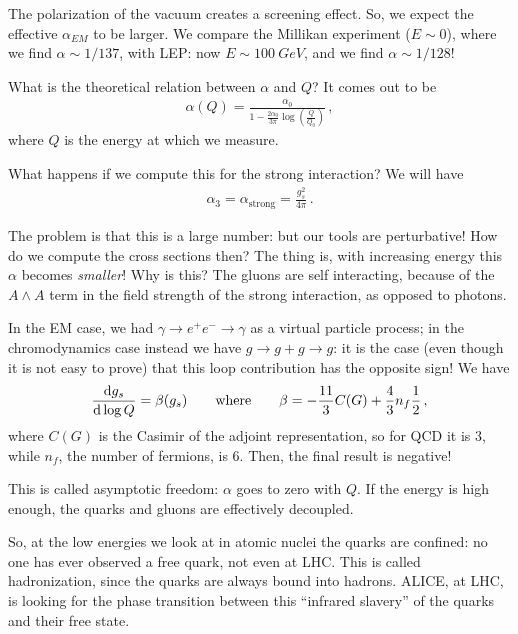 \documentclass[main.tex]{subfiles}
\begin{document}
The polarization of the vacuum creates a screening effect. 
So, we expect the effective \(\alpha_{EM}\) to be larger. 
We compare the Millikan experiment (\(E \sim 0\)), where we find \(\alpha \sim 1/137\), with LEP: now \(E \sim \SI{100}{GeV}\), and we find \(\alpha \sim 1/128\)!

What is the theoretical relation between \(\alpha \) and \(Q\)? It comes out to be 
%
\begin{align}
\alpha (Q) = \frac{\alpha_0 }{1 - \frac{2 \alpha_0 }{3 \pi } \log(\frac{Q}{Q_0 })}
\,,
\end{align}
%
where \(Q\) is the energy at which we measure. 

What happens if we compute this for the strong interaction? We will have 
%
\begin{align}
\alpha_3 = \alpha _{\text{strong}} = \frac{g^2_{s}}{4 \pi }
\,.
\end{align}

The problem is that this is a large number: but our tools are perturbative! How do we compute the cross sections then? 
The thing is, with increasing energy this \(\alpha \) becomes \emph{smaller}! 
Why is this? The gluons are self interacting, because of the \(A \wedge A\) term in the field strength of the strong interaction, as opposed to photons. 

In the EM case, we had \(\gamma \to e^{+} e^{-} \to \gamma \) as a virtual particle process; in the chromodynamics case instead we have \(g \to g + g \to g \): it is the case (even though it is not easy to prove) that this loop contribution has the opposite sign! We have 
%
\begin{align}
\dv{g_{s}}{\log Q} = \beta (g_s) 
\qquad \text{where} \qquad
\beta = - \frac{11}{3} C(G) +  \frac{4}{3} n_f \frac{1}{2}  
\,,
\end{align}
%
where \(C(G)\) is the Casimir of the adjoint representation, so for QCD it is 3, while \(n_f\), the number of fermions, is 6. Then, the final result is negative! 

This is called asymptotic freedom: \(\alpha \) goes to zero with \(Q\). 
If the energy is high enough, the quarks and gluons are effectively decoupled. 

So, at the low energies we look at in atomic nuclei the quarks are confined: no one has ever observed a free quark, not even at LHC. 
This is called hadronization, since the quarks are always bound into hadrons. ALICE, at LHC, is looking for the phase transition between this ``infrared slavery'' of the quarks and their free state. 
\end{document}
